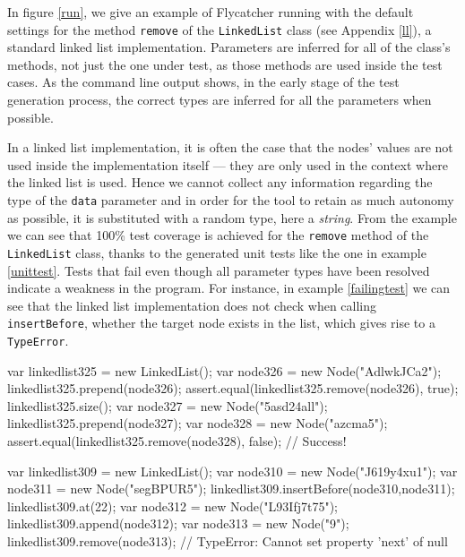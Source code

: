 In figure \ref{run}, we give an example of \textsf{Flycatcher} running with the default settings for the method \texttt{remove} of the \texttt{LinkedList} class (see Appendix \ref{ll}), a standard linked list implementation. Parameters are inferred for all of the class's methods, not just the one under test, as those methods are used inside the test cases. As the command line output shows, in the early stage of the test generation process, the correct types are inferred for all the parameters when possible.

In a linked list implementation, it is often the case that the nodes' values are not used inside the implementation itself --- they are only used in the context where the linked list is used. Hence we cannot collect any information regarding the type of the \texttt{data} parameter and in order for the tool to retain as much autonomy as possible, it is substituted with a random type, here a \emph{string}. From the example we can see that 100\% test coverage is achieved for the \texttt{remove} method of the \texttt{LinkedList} class, thanks to the generated unit tests like the one in example \ref{unittest}. Tests that fail even though all parameter types have been resolved indicate a weakness in the program. For instance, in example \ref{failingtest} we can see that the linked list implementation does not check when calling \texttt{insertBefore}, whether the target node exists in the list, which gives rise to a \texttt{TypeError}.\\[4cm]

\begin{code}[caption=Unit test, label=unittest]
var linkedlist325 = new LinkedList();
var node326 = new Node("AdlwkJCa2");
linkedlist325.prepend(node326);
assert.equal(linkedlist325.remove(node326), true);
linkedlist325.size();
var node327 = new Node("5asd24all");
linkedlist325.prepend(node327);
var node328 = new Node("azcma5");
assert.equal(linkedlist325.remove(node328), false);
// Success!
\end{code}

\begin{code}[caption=Failing test, label=failingtest]
var linkedlist309 = new LinkedList();
var node310 = new Node("J619y4xu1");
var node311 = new Node("segBPUR5");
linkedlist309.insertBefore(node310,node311);
linkedlist309.at(22);
var node312 = new Node("L93Ifj7t75");
linkedlist309.append(node312);
var node313 = new Node("9");
linkedlist309.remove(node313);
// TypeError: Cannot set property 'next' of null   
\end{code}


